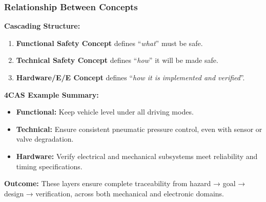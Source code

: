 \begin{frame}
	\frametitle{Relationship Between Concepts}
  \textbf{Cascading Structure:}
  \begin{enumerate}
    \item \textbf{Functional Safety Concept} defines “\emph{what}” must be safe.
    \item \textbf{Technical Safety Concept} defines “\emph{how}” it will be made safe.
    \item \textbf{Hardware/E/E Concept} defines “\emph{how it is implemented and verified}”.
  \end{enumerate}
  \textbf{4CAS Example Summary:}
  \begin{itemize}
    \item \textbf{Functional:} Keep vehicle level under all driving modes.  
    \item \textbf{Technical:} Ensure consistent pneumatic pressure control, even with sensor or valve degradation.  
    \item \textbf{Hardware:} Verify electrical and mechanical subsystems meet reliability and timing specifications.
  \end{itemize}
  \textbf{Outcome:}
  These layers ensure complete traceability from hazard → goal → design → verification, across both mechanical and electronic domains.
\end{frame}


